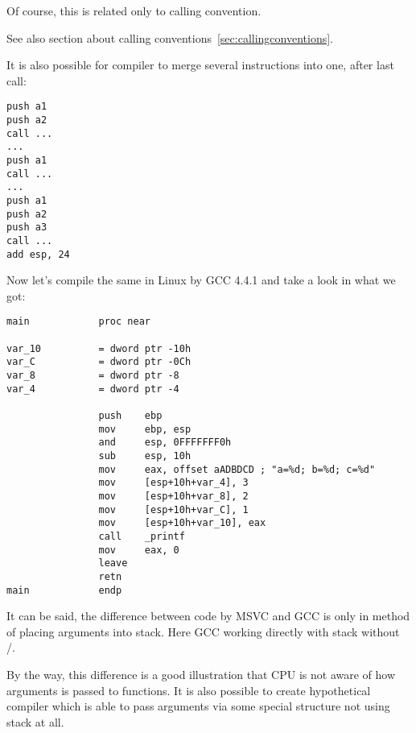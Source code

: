 {Of course, this is related only to  calling convention.}

{See also section about calling conventions}~\ref{sec:callingconventions}.

{It is also possible for compiler to merge several  instructions into one, after last call:}

\begin{lstlisting}
push a1
push a2
call ...
...
push a1
call ...
...
push a1
push a2
push a3
call ...
add esp, 24
\end{lstlisting}

{Now let's compile the same in Linux by GCC 4.4.1 and take a look in \IDA what we got:}

\begin{lstlisting}
main            proc near

var_10          = dword ptr -10h
var_C           = dword ptr -0Ch
var_8           = dword ptr -8
var_4           = dword ptr -4

                push    ebp
                mov     ebp, esp
                and     esp, 0FFFFFFF0h
                sub     esp, 10h
                mov     eax, offset aADBDCD ; "a=%d; b=%d; c=%d"
                mov     [esp+10h+var_4], 3
                mov     [esp+10h+var_8], 2
                mov     [esp+10h+var_C], 1
                mov     [esp+10h+var_10], eax
                call    _printf
                mov     eax, 0
                leave
                retn
main            endp
\end{lstlisting}

{It can be said, the difference between code by MSVC and GCC is only in method of placing arguments into stack. 
Here GCC working directly with stack without \PUSH/\POP.}

{By the way, this difference is a good illustration that CPU is not aware of how arguments is passed to functions. 
It is also possible to create hypothetical compiler which is able to pass arguments 
via some special structure not using stack at all.}
